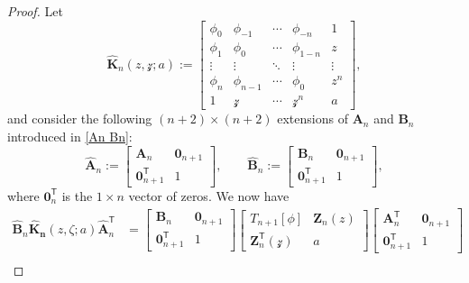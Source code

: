 \documentclass[10pt,a4paper]{amsart}
\numberwithin{equation}{section}
\newcommand{\ze}{\zeta}
\begin{document}
		\begin{proof}
			Let
			\begin{equation*}
				\boldsymbol{\widehat{K}}_{n}(z,\mathcal{z};a) := \begin{bmatrix}
					\phi_{0} & \phi_{-1} & \cdots & \phi_{-n} & 1\\
					\phi_{1} & \phi_{0} & \cdots & \phi_{1-n} & z\\
					\vdots & \vdots & \ddots & \vdots & \vdots\\
					\phi_{n} & \phi_{n-1} & \cdots & \phi_{0} & z^{n} \\
					1 & \mathcal{z} & \cdots & \mathcal{z}^{n} & a
				\end{bmatrix},
			\end{equation*}
			and consider the following $(n+2)\times(n+2)$ extensions of $\boldsymbol{A}_{n}$ and $ \boldsymbol{B}_{n}$ introduced in \eqref{An Bn}:
			\begin{equation*}
				\boldsymbol{\widehat{A}}_{n}:=\begin{bmatrix}
					\boldsymbol{A}_{n} & \boldsymbol{0}_{n+1} \\
					\boldsymbol{0}^{\mathsf T}_{n+1} & 1
				\end{bmatrix}, \qquad 	\boldsymbol{\widehat{B}}_{n}:=\begin{bmatrix}
					\boldsymbol{B}_{n} & \boldsymbol{0}_{n+1} \\
					\boldsymbol{0}^{\mathsf T}_{n+1} & 1
				\end{bmatrix},
			\end{equation*}
			where $\boldsymbol{0}^{\mathsf T}_{n}$ is the $1\times n$ vector of zeros. We now have
			\begin{align}
					\boldsymbol{\widehat{B}}_{n}
					\boldsymbol{\widehat{K}_{n}}(z,\ze;a)
					\boldsymbol{\widehat{A}}_{n}^{\mathsf T} & = \begin{bmatrix}
						\boldsymbol{B}_{n} & \boldsymbol{0}_{n+1} \\
						\boldsymbol{0}^{\mathsf T}_{n+1} & 1
					\end{bmatrix} \begin{bmatrix}
						T_{n+1}[\phi] & \boldsymbol{Z}_{n}(z) \\
						\boldsymbol{Z}^{\mathsf T}_{n}(\mathcal{z}) & a
					\end{bmatrix} \begin{bmatrix}
						\boldsymbol{A}^{\mathsf T}_{n} & \boldsymbol{0}_{n+1} \\
						\boldsymbol{0}^{\mathsf T}_{n+1} & 1
					\end{bmatrix} \nonumber\\

\end{align}
\end{proof}
\end{document}
